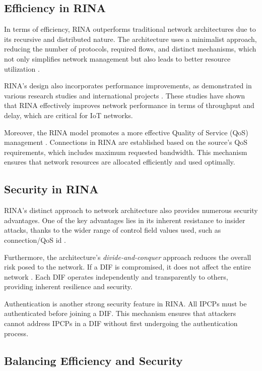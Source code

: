 \documentclass{ieeeaccess}
\begin{document}
\subsection{Efficiency in RINA}

In terms of efficiency, RINA outperforms traditional network architectures due to its recursive and distributed nature. The architecture uses a minimalist approach, reducing the number of protocols, required flows, and distinct mechanisms, which not only simplifies network management but also leads to better resource utilization \cite{small2012}.

RINA's design also incorporates performance improvements, as demonstrated in various research studies and international projects \cite{trouva2010internet, peymanICC16}. These studies have shown that RINA effectively improves network performance in terms of throughput and delay, which are critical for IoT networks.

Moreover, the RINA model promotes a more effective Quality of Service (QoS) management \cite{gaixas2016assuring}. Connections in RINA are established based on the source's QoS requirements, which includes maximum requested bandwidth. This mechanism ensures that network resources are allocated efficiently and used optimally.

\subsection{Security in RINA}

RINA's distinct approach to network architecture also provides numerous security advantages. One of the key advantages lies in its inherent resistance to insider attacks, thanks to the wider range of control field values used, such as connection/QoS id \cite{boddapati2012assessing}.

Furthermore, the architecture's \textit{divide-and-conquer} approach reduces the overall risk posed to the network. If a DIF is compromised, it does not affect the entire network \cite{day2008networking}. Each DIF operates independently and transparently to others, providing inherent resilience and security.

Authentication is another strong security feature in RINA. All IPCPs must be authenticated before joining a DIF. This mechanism ensures that attackers cannot address IPCPs in a DIF without first undergoing the authentication process.

\subsection{Balancing Efficiency and Security}
\end{document}
